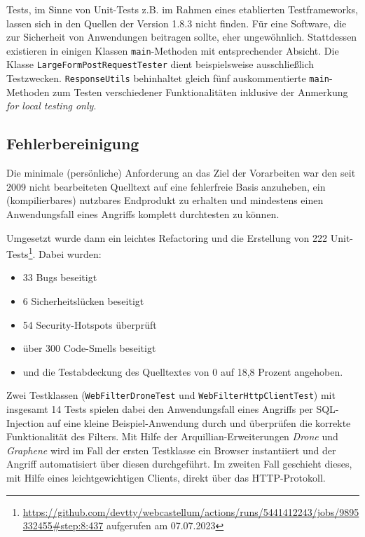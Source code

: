 Tests, im Sinne von Unit-Tests z.B. im Rahmen eines etablierten Testframeworks, lassen sich in den Quellen der Version 1.8.3 nicht finden. Für eine Software, die zur Sicherheit von Anwendungen beitragen sollte, eher ungewöhnlich. Stattdessen existieren in einigen Klassen \verb=main=-Methoden mit entsprechender Absicht. Die Klasse \verb=LargeFormPostRequestTester= dient beispielsweise ausschließlich Testzwecken. \verb=ResponseUtils= behinhaltet gleich fünf auskommentierte \verb=main=-Methoden zum Testen verschiedener Funktionalitäten inklusive der Anmerkung \emph{for local testing only}. 


\subsection{Fehlerbereinigung}

Die minimale (persönliche) Anforderung an das Ziel der Vorarbeiten war den seit 2009 nicht bearbeiteten Quelltext auf eine fehlerfreie Basis anzuheben, ein (kompilierbares) nutzbares Endprodukt zu erhalten und mindestens einen Anwendungsfall eines Angriffs komplett durchtesten zu können.

Umgesetzt wurde dann ein leichtes Refactoring und die Erstellung von 222 Unit-Tests\footnote{\url{https://github.com/devtty/webcastellum/actions/runs/5441412243/jobs/9895332455\#step:8:437} aufgerufen am 07.07.2023}. Dabei wurden:

\begin{itemize}
    \item 33 Bugs beseitigt
    \item 6 Sicherheitslücken beseitigt
    \item 54 Security-Hotspots überprüft
    \item über 300 Code-Smells beseitigt
    \item und die Testabdeckung des Quelltextes von 0 auf 18,8 Prozent angehoben.
\end{itemize}

Zwei Testklassen (\verb=WebFilterDroneTest= und \verb=WebFilterHttpClientTest=) mit insgesamt 14 Tests spielen dabei den Anwendungsfall eines Angriffs per SQL-Injection auf eine kleine Beispiel-Anwendung durch und überprüfen die korrekte Funktionalität des Filters. Mit Hilfe der Arquillian-Erweiterungen \emph{Drone} und \emph{Graphene} wird im Fall der ersten Testklasse ein Browser instantiiert und der Angriff automatisiert über diesen durchgeführt. Im zweiten Fall geschieht dieses, mit Hilfe eines leichtgewichtigen Clients, direkt über das HTTP-Protokoll.

